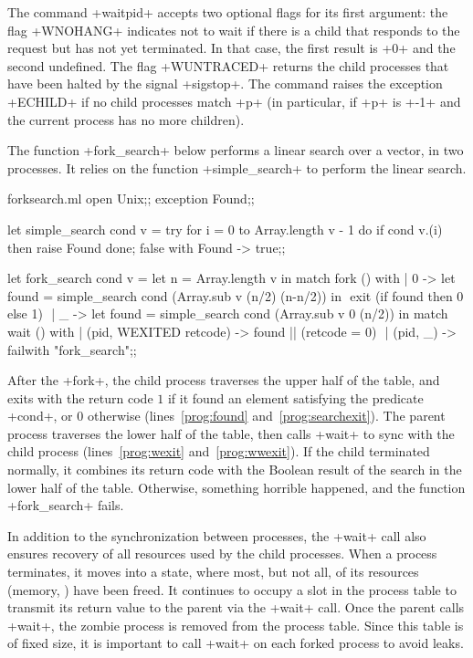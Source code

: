 The command \ml+waitpid+ accepts two optional flags for its first
argument: the flag \ml+WNOHANG+ indicates not to wait if there is
a child that responds to the request but has not yet terminated.
In that case, the first result is \ml+0+ and the second undefined.
The flag \ml+WUNTRACED+ returns the child processes that have been
halted by the signal \ml+sigstop+.  The command raises the exception
\ml+ECHILD+ if no child processes match \ml+p+ (in particular, if
\ml+p+ is \ml+-1+ and the current process has no more children).

\begin{example}
\label{ex/forksearch}
The function \ml+fork_search+ below performs a linear search over
a vector, in two processes. It relies on the function \ml+simple_search+
to perform the linear search.
%
\begin{listingcodefile}[style=numbers]{forksearch.ml}
open Unix;;
exception Found;;

let simple_search cond v =
 try
   for i = 0 to Array.length v - 1 do
     if cond v.(i) then raise Found
   done;
   false
 with Found -> true;;

let fork_search cond v =
 let n = Array.length v in
 match fork () with
 | 0 ->
     let found = simple_search cond (Array.sub v (n/2) (n-n/2)) in
$\label{prog:found}$
     exit (if found then 0 else 1) $\label{prog:searchexit}$
 | _ ->
     let found = simple_search cond (Array.sub v 0 (n/2)) in
     match wait () with
     | (pid, WEXITED retcode) -> found || (retcode = 0) $\label{prog:wexit}$
     | (pid, _)               -> failwith "fork_search";;$\label{prog:wwexit}$
\end{listingcodefile}
%
After the \ml+fork+, the child process traverses the upper half of
the table, and exits with the return code $1$ if it found an element
satisfying the predicate \ml+cond+, or $0$ otherwise
(lines~\ref{prog:found} and~\ref{prog:searchexit}). The parent process
traverses the lower half of the table, then calls \ml+wait+ to
sync with the child process (lines~\ref{prog:wexit}
and~\ref{prog:wwexit}). If the child terminated normally, it combines
its return code with the Boolean result of the search in the lower
half of the table. Otherwise, something horrible happened, and the
function \ml+fork_search+ fails.
\end{example}

In addition to the synchronization between processes, the \ml+wait+
call also ensures recovery of all resources used by the child
processes.  When a process terminates, it moves into a 
state, where most, but not all, of its resources (memory, \etc) have
been freed. It continues to occupy a slot in the process table to
transmit its return value to the parent via the \ml+wait+ call.
Once the parent calls \ml+wait+, the zombie process is removed from
the process table. Since this table is of fixed size, it is important
to call \ml+wait+ on each forked process to avoid leaks.

